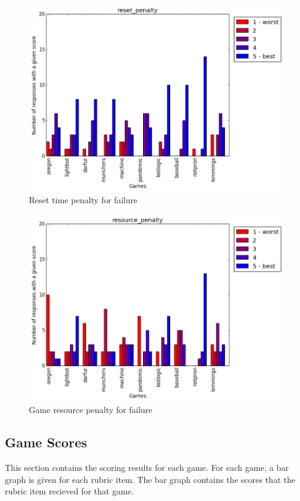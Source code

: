 			\begin{figure}[h] 
			\centering 
			\includegraphics[height=0.33\textheight]{reset_penalty_scores.png} 
			\caption{Reset time penalty for failure}
			\end{figure}

			\begin{figure}[h] 
			\centering 
			\includegraphics[height=0.33\textheight]{resource_penalty_scores.png} 
			\caption{Game resource penalty for failure}
			\end{figure}


\cleardoublepage
		\subsection{Game Scores}
			This section contains the scoring results for each game. For each game, a bar graph is given for each rubric item. The bar graph contains the scores that the rubric item recieved for that game.

